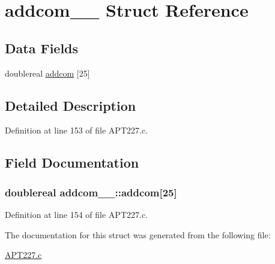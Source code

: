 \hypertarget{structaddcom__1__}{}\section{addcom\+\_\+\_\+ Struct Reference}
\label{structaddcom__1__}
\subsection*{Data Fields}
\begin{DoxyCompactItemize}
\item 
doublereal \hyperlink{structaddcom__1___a194477e1abbc697bd2c693c2c85d60b3}{addcom} \mbox{[}25\mbox{]}
\end{DoxyCompactItemize}


\subsection{Detailed Description}


Definition at line 153 of file A\+P\+T227.\+c.



\subsection{Field Documentation}
\subsubsection[{\texorpdfstring{addcom}{addcom}}]{\setlength{\rightskip}{0pt plus 5cm}doublereal addcom\+\_\+\_\+\+::addcom\mbox{[}25\mbox{]}}\hypertarget{structaddcom__1___a194477e1abbc697bd2c693c2c85d60b3}{}\label{structaddcom__1___a194477e1abbc697bd2c693c2c85d60b3}


Definition at line 154 of file A\+P\+T227.\+c.



The documentation for this struct was generated from the following file\+:\begin{DoxyCompactItemize}
\item 
\hyperlink{APT227_8c}{A\+P\+T227.\+c}\end{DoxyCompactItemize}
